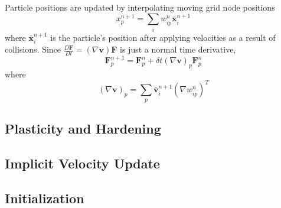 \documentclass{scrartcl}
\theoremstyle{definition}
\begin{document}
Particle positions are updated by interpolating moving grid node positions
\begin{equation*}
x_p^{n+1}=\sum_i{w_{ip}^n \bar{\textbf{x}}_i^{n+1}}
\end{equation*}
where $\bar{\textbf{x}}_i^{n+1}$ is the particle's position after applying velocities as a result of collisions. Since $\frac{D\textbf{F}}{Dt} = (\nabla \textbf{v})\textbf{F}$ is just a normal time derivative,
\begin{equation*}
\textbf{F}_p^{n+1} = \textbf{F}_p^n + \delta t (\nabla \textbf{v})_p\textbf{F}_p^n
\end{equation*}
where
\begin{equation*}
(\nabla \textbf{v})_p = \sum_p{\bar{\textbf{v}}_i^{n+1}(\nabla w_{ip}^n)^T}
\end{equation*}

\subsection{Plasticity and Hardening}

\subsection{Implicit Velocity Update}

\subsection{Initialization}

\end{document}
